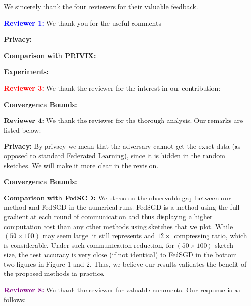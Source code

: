 \documentclass{article}
\begin{document}
We sincerely thank the four reviewers for their valuable feedback.


\vspace{0.01in}

\textbf{\textcolor{blue}{Reviewer 1:}} We thank you for the useful comments:\vspace{-5pt}

\textbf{Privacy:} 


\textbf{Comparison with PRIVIX:} 

\textbf{Experiments:} 


\vspace{0.01in}


\textbf{\textcolor{red}{Reviewer 3:}} We thank the reviewer for the interest in our contribution:\vspace{-5pt}

\textbf{Convergence Bounds:} 


\vspace{0.01in}
\textbf{\textcolor{green!50!black}{Reviewer 4:}} We thank the reviewer for the thorough analysis. Our remarks are listed below:\vspace{-5pt}

\textbf{Privacy:} By privacy we mean that the adversary cannot get the exact data (as opposed to standard Federated Learning), since it is hidden in the random sketches. We will make it more clear in the revision.

\textbf{Convergence Bounds:} 

\textbf{Comparison with FedSGD:} 
We stress on the observable gap between our method and FedSGD in the numerical runs. FedSGD is a method using the full gradient at each round of communication and thus displaying a higher computation cost than any other methods using sketches that we plot.
While $(50 \times 100)$ may seem large, it still represents and $12 \times$ compressing ratio, which is considerable. 
Under such communication reduction, for $(50 \times 100)$ sketch size, the test accuracy is very close (if not identical) to FedSGD in the bottom two figures in Figure 1 and 2. Thus, we believe our results validates the benefit of the proposed methods in practice.

\vspace{0.01in}

\textbf{\textcolor{purple}{Reviewer 8:}} We thank the reviewer for valuable comments. Our response is as follows:\vspace{-5pt}
\end{document}

